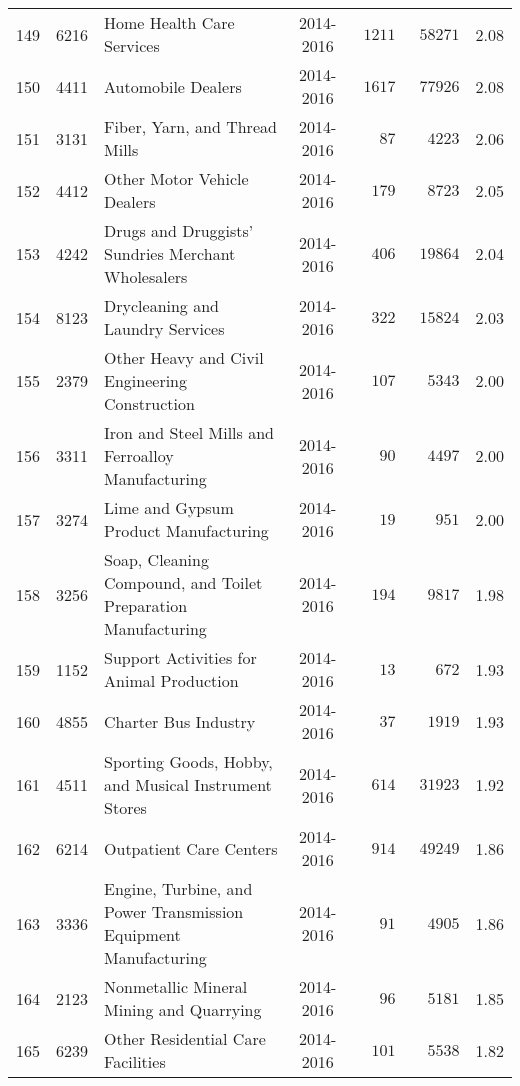 \documentclass[9pt, oneside]{article}   	%
\begin{document}
\begin{longtable}{lcp{3in}cccc}
149  & 6216 & Home Health Care Services & 2014-2016 & $\phantom{0}1211$ & $\phantom{0}58271$ &  2.08 \\
150  & 4411 & Automobile Dealers & 2014-2016 & $\phantom{0}1617$ & $\phantom{0}77926$ &  2.08 \\
151  & 3131 & Fiber, Yarn, and Thread Mills & 2014-2016 & $\phantom{000}87$ & $\phantom{00}4223$ &  2.06 \\
152  & 4412 & Other Motor Vehicle Dealers & 2014-2016 & $\phantom{00}179$ & $\phantom{00}8723$ &  2.05 \\
153  & 4242 & Drugs and Druggists' Sundries Merchant Wholesalers & 2014-2016 & $\phantom{00}406$ & $\phantom{0}19864$ &  2.04 \\
154  & 8123 & Drycleaning and Laundry Services & 2014-2016 & $\phantom{00}322$ & $\phantom{0}15824$ &  2.03 \\
155  & 2379 & Other Heavy and Civil Engineering Construction & 2014-2016 & $\phantom{00}107$ & $\phantom{00}5343$ &  2.00 \\
156  & 3311 & Iron and Steel Mills and Ferroalloy Manufacturing & 2014-2016 & $\phantom{000}90$ & $\phantom{00}4497$ &  2.00 \\
157  & 3274 & Lime and Gypsum Product Manufacturing & 2014-2016 & $\phantom{000}19$ & $\phantom{000}951$ &  2.00 \\
158  & 3256 & Soap, Cleaning Compound, and Toilet Preparation Manufacturing & 2014-2016 & $\phantom{00}194$ & $\phantom{00}9817$ &  1.98 \\
159  & 1152 & Support Activities for Animal Production & 2014-2016 & $\phantom{000}13$ & $\phantom{000}672$ &  1.93 \\
160  & 4855 & Charter Bus Industry & 2014-2016 & $\phantom{000}37$ & $\phantom{00}1919$ &  1.93 \\
161  & 4511 & Sporting Goods, Hobby, and Musical Instrument Stores & 2014-2016 & $\phantom{00}614$ & $\phantom{0}31923$ &  1.92 \\
162  & 6214 & Outpatient Care Centers & 2014-2016 & $\phantom{00}914$ & $\phantom{0}49249$ &  1.86 \\
163  & 3336 & Engine, Turbine, and Power Transmission Equipment Manufacturing & 2014-2016 & $\phantom{000}91$ & $\phantom{00}4905$ &  1.86 \\
164  & 2123 & Nonmetallic Mineral Mining and Quarrying & 2014-2016 & $\phantom{000}96$ & $\phantom{00}5181$ &  1.85 \\
165  & 6239 & Other Residential Care Facilities & 2014-2016 & $\phantom{00}101$ & $\phantom{00}5538$ &  1.82 \\

\end{longtable}
\end{document}
